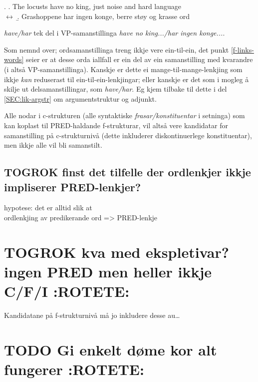\documentclass[11pt,a4paper,oneside,draft]{book}
\begin{document}
\ex. \a. The locusts have no king, just noise and hard language\\
     $\leftrightarrow$
     \b. Grashoppene har ingen konge, berre støy og krasse ord



\emph{have/har} tek del i VP-samanstillinga \emph{have no king.../har ingen konge...}.

Som nemnd over; ordsamanstillinga treng ikkje vere ein-til-ein, det
punkt \ref{f-links-words} seier er at desse orda iallfall er ein del
av ein samanstilling med kvarandre (i \Last altså
VP-samanstillinga). Kanskje er dette ei mange-til-mange-lenkjing som
ikkje \emph{kan} reduserast til ein-til-ein-lenkjingar; eller kanskje er
det som i \Last mogleg å skilje ut delsamanstillingar, som
\emph{have/har}. Eg kjem tilbake til dette i del \ref{SEC:lik-argstr} om
argumentstruktur og adjunkt. 


Alle nodar i c-strukturen (alle syntaktiske \emph{frasar/konstituentar} i
setninga) som kan koplast til PRED-haldande f-strukturar, vil altså
vere kandidatar for samanstilling på c-strukturnivå (dette inkluderer
diskontinuerlege konstituentar), men ikkje alle vil bli samanstilt.
\subsection{\textbf{TOGROK} finst det tilfelle der ordlenkjer ikkje impliserer PRED-lenkjer?}
\label{sec-3.5.1}

   hypotese: det er alltid slik at \\
   ordlenkjing av predikerande ord => PRED-lenkje
\section{\textbf{TOGROK} kva med ekspletivar? ingen PRED men heller ikkje C/F/I \textbf{:ROTETE:}}
\label{sec-3.6}

Kandidatane på f-strukturnivå må jo inkludere desse au\ldots{}
\section{\textbf{TODO} Gi enkelt døme kor alt fungerer \textbf{:ROTETE:}}
\label{sec-3.7}
\end{document}
